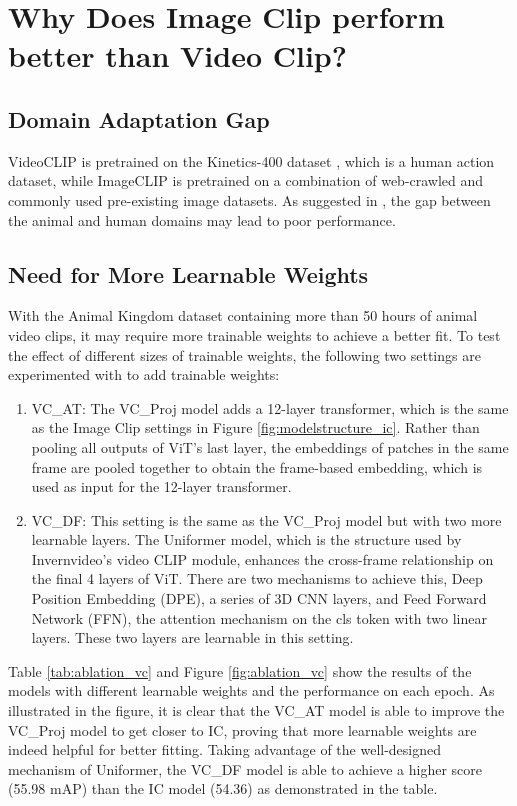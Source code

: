 \section{Why Does Image Clip perform better than Video Clip?}
\label{sec:discussion_vc}
\subsection{Domain Adaptation Gap}
VideoCLIP is pretrained on the Kinetics-400 dataset \parencite{kay2017kinetics}, which is a human action dataset, while ImageCLIP is pretrained on a combination of web-crawled and commonly used pre-existing image datasets. As suggested in \parencite{farahani2021brief}, the gap between the animal and human domains may lead to poor performance.

\subsection{Need for More Learnable Weights}
With the Animal Kingdom dataset containing more than 50 hours of animal video clips, it may require more trainable weights to achieve a better fit. To test the effect of different sizes of trainable weights, the following two settings are experimented with to add trainable weights:

\begin{enumerate}
    \item VC\_AT: The VC\_Proj model adds a 12-layer transformer, which is the same as the Image Clip settings in Figure \ref{fig:modelstructure_ic}. Rather than pooling all outputs of ViT's last layer, the embeddings of patches in the same frame are pooled together to obtain the frame-based embedding, which is used as input for the 12-layer transformer.
    \item VC\_DF: This setting is the same as the VC\_Proj model but with two more learnable layers. The Uniformer model, which is the structure used by Invernvideo's video CLIP module, enhances the cross-frame relationship on the final 4 layers of ViT. There are two mechanisms to achieve this, Deep Position Embedding (DPE), a series of 3D CNN layers, and Feed Forward Network (FFN), the attention mechanism on the cls token with two linear layers. These two layers are learnable in this setting.
\end{enumerate}

Table \ref{tab:ablation_vc} and Figure \ref{fig:ablation_vc} show the results of the models with different learnable weights and the performance on each epoch. As illustrated in the figure, it is clear that the VC\_AT model is able to improve the VC\_Proj model to get closer to IC, proving that more learnable weights are indeed helpful for better fitting. Taking advantage of the well-designed mechanism of Uniformer, the VC\_DF model is able to achieve a higher score (55.98 mAP) than the IC model (54.36) as demonstrated in the table. 

